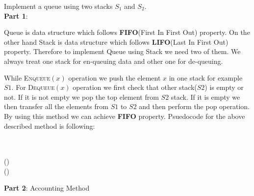 \documentclass[a4paper,11pt]{article}
\theoremstyle{quest}
\newenvironment{solution}[2][Solution]{\begin{trivlist}
		\item[\hskip \labelsep {\bfseries #1}\hskip \labelsep {\bfseries #2.}]}{\end{trivlist}}
\begin{document}
\newpage
\begin{solution}3  Implement a queue using two stacks $S_1$ and $S_2$.\\
	
	\textbf{Part 1}:
	
	Queue is data structure which follows \textbf{FIFO}(First In First Out) property. On the other hand Stack is data structure which follows \textbf{LIFO}(Last In First Out) property. Therefore to implement Queue using Stack we need two of them. We always treat one stack for en-queuing data and other one for de-queuing. 
	
	While \textsc{Enqueue}$(x)$ operation we push the element $x$ in one stack for example $S1$. For \textsc{Dequeue}$(x)$ operation we first check that other stack($S2$) is empty or not. If it is not empty we pop the top element from $S2$ stack. If it is empty we then transfer all the elements from $S1$ to $S2$ and then perform the pop operation.
	By using this method we can achieve \textbf{FIFO} property. Psuedocode for the above described method is following:
	
	\begin{algorithm}[h]
		\begin{algorithmic}
			 
			 \\
			
			 
			\EndFunction \\
			
			()
			 
			 
			\EndIf
			\EndFunction\\
			
			()
			\EndWhile
			\EndFunction
		\end{algorithmic}
	\end{algorithm}
	
	\textbf{Part 2}: Accounting Method
	

\end{solution}
\end{document}
